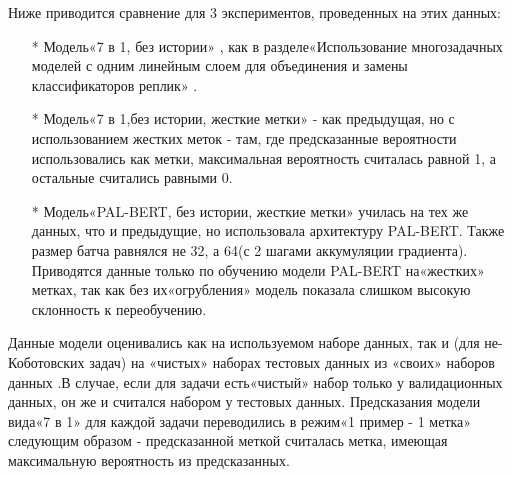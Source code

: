Ниже приводится сравнение для 3 экспериментов, проведенных на этих данных:
\begin{itemize}
\item[*] Модель«7 в 1, без истории» , как в разделе«Использование многозадачных моделей с одним линейным слоем для объединения и замены классификаторов реплик» .
\item[*] Модель«7 в 1,без истории, жесткие метки» - как предыдущая, но с использованием жестких меток - там, где предсказанные вероятности использовались как метки, максимальная вероятность считалась равной 1, а остальные считались равными 0.
\item[*] Модель«PAL-BERT, без истории, жесткие метки» училась на тех же данных, что и предыдущие, но использовала архитектуру PAL-BERT. Также размер батча равнялся не 32, а 64(с 2 шагами аккумуляции градиента). Приводятся данные только по обучению модели PAL-BERT на«жестких» метках, так как без их«огрубления» модель показала слишком высокую склонность к переобучению.
\end{itemize}
Данные модели оценивались как на используемом наборе данных, так и  (для не-Коботовских задач) на «чистых» наборах тестовых данных из «своих» наборов данных .В случае, если для задачи есть«чистый» набор только у валидационных данных, он же и считался набором у тестовых данных.
Предсказания модели вида«7 в 1» для каждой задачи переводились в режим«1 пример - 1 метка» следующим образом - предсказанной меткой считалась метка, имеющая максимальную вероятность из предсказанных.


